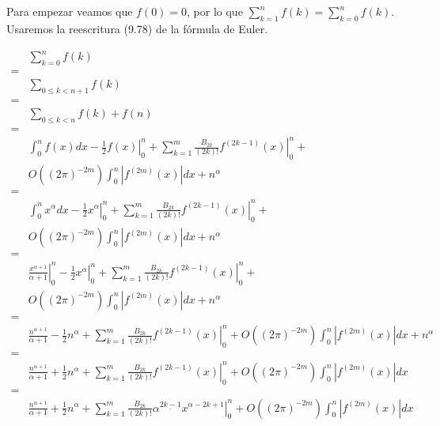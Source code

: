 \documentclass{article}
\begin{document}
\section{}

Para empezar veamos que $f(0) = 0$, por lo que $\sum_{k=1}^n f(k) = \sum_{k=0}^n f(k)$.
Usaremos la reescritura (9.78) de la fórmula de Euler.

\begin{align*}
& \sum_{k=0}^n f(k) \\
= & \\
& \sum_{0 \leq k < n+1} f(k) \\
= & \\
& \sum_{0 \leq k < n} f(k) + f(n) \\
= & \\
& \int_0^n f(x)dx - \left. \frac{1}{2} f(x) \right|_0^n + \sum_{k=1}^m \frac{B_{2k}}{(2k)!} \left. f^{(2k-1)}(x) \right|_0^n + \\
& O((2\pi)^{-2m}) \int_0^n | f^{(2m)}(x) | dx + n^\alpha \\
= & \\
& \int_0^n x^\alpha dx - \left. \frac{1}{2} x^\alpha \right|_0^n + \sum_{k=1}^m \frac{B_{2k}}{(2k)!} \left. f^{(2k-1)}(x) \right|_0^n + \\
& O((2\pi)^{-2m}) \int_0^n | f^{(2m)}(x) | dx + n^\alpha \\
= & \\
& \left. \frac{x^{\alpha+1}}{\alpha+1} \right|_0^n
  - \left. \frac{1}{2} x^\alpha \right|_0^n + \sum_{k=1}^m \frac{B_{2k}}{(2k)!} \left. f^{(2k-1)}(x) \right|_0^n + \\
& O((2\pi)^{-2m}) \int_0^n | f^{(2m)}(x) | dx + n^\alpha \\
= & \\
& \frac{n^{\alpha+1}}{\alpha+1}
  - \frac{1}{2} n^\alpha + \sum_{k=1}^m \frac{B_{2k}}{(2k)!} \left. f^{(2k-1)}(x) \right|_0^n 
  + O((2\pi)^{-2m}) \int_0^n | f^{(2m)}(x) | dx + n^\alpha \\
= & \\
& \frac{n^{\alpha+1}}{\alpha+1}
  + \frac{1}{2} n^\alpha + \sum_{k=1}^m \frac{B_{2k}}{(2k)!} \left. f^{(2k-1)}(x) \right|_0^n 
  + O((2\pi)^{-2m}) \int_0^n | f^{(2m)}(x) | dx \\
= & \\
& \frac{n^{\alpha+1}}{\alpha+1}
  + \frac{1}{2} n^\alpha + \sum_{k=1}^m \frac{B_{2k}}{(2k)!} \left. \alpha^{\underline{2k-1}} x^{\alpha-2k+1} \right|_0^n +
  O((2\pi)^{-2m}) \int_0^n | f^{(2m)}(x) | dx \\
\end{align*}
\end{document}
